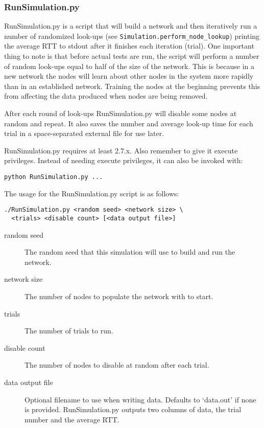 \documentclass[notitlepage,12pt]{article}
\begin{document}
\subsubsection{RunSimulation.py}
\label{sec:runsim}
RunSimulation.py is a script that will build a network and then iteratively run
a number of randomized look-ups (see \texttt{Simulation.perform\_node\_lookup})
printing the average RTT to stdout after it finishes each iteration (trial). One
important thing to note is that before actual tests are run, the script will
perform a number of random look-ups equal to half of the size of the
network. This is because in a new network the nodes will learn about other nodes
in the system more rapidly than in an established network. Training the nodes at
the beginning prevents this from affecting the data produced when nodes are
being removed.

After each round of look-ups RunSimulation.py will disable some nodes at
random and repeat. It also saves the number and average look-up time for each
trial in a space-separated external file for use later.

RunSimulation.py requires at least 2.7.x. Also remember to give it execute
privileges. Instead of needing execute privileges, it can also be invoked with:
\begin{verbatim}
python RunSimulation.py ...
\end{verbatim}

The usage for the RunSimulation.py script is as follows:

\begin{verbatim}
./RunSimulation.py <random seed> <network size> \
  <trials> <disable count> [<data output file>]
\end{verbatim}

\begin{description}
\item[random seed] The random seed that this simulation will use to build and
  run the network.
\item[network size] The number of nodes to populate the network with to start.
\item[trials] The number of trials to run.
\item[disable count] The number of nodes to disable at random after each trial.
\item[data output file] Optional filename to use when writing data. Defaults to
  `data.out' if none is provided. RunSimulation.py outputs two columns of data,
  the trial number and the average RTT.
\end{description}
\end{document}
